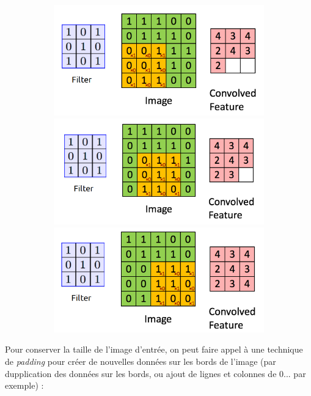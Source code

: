 \documentclass{article}
\begin{document}
\begin{figure}[H]
\begin{figure}[H]
  \includegraphics[width=\linewidth]{img/conv7.png}
\endminipage\hfill
{}
  \includegraphics[width=\linewidth]{img/conv8.png}
\endminipage\hfill
{}%
  \includegraphics[width=\linewidth]{img/conv9.png}
\endminipage
\end{figure}

\end{figure}

Pour conserver la taille de l'image d'entrée, on peut faire appel à une technique 
de \textit{padding} pour créer de nouvelles données sur les bords de l'image (par dupplication 
des données sur les bords, ou ajout de lignes et colonnes de 0... par exemple) : 
\end{document}
